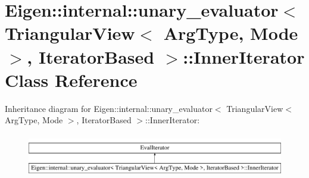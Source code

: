 \hypertarget{class_eigen_1_1internal_1_1unary__evaluator_3_01_triangular_view_3_01_arg_type_00_01_mode_01_4_0e8ca4efc3cb45e07bfa597fdc256f969}{}\section{Eigen\+::internal\+::unary\+\_\+evaluator$<$ Triangular\+View$<$ Arg\+Type, Mode $>$, Iterator\+Based $>$\+::Inner\+Iterator Class Reference}
\label{class_eigen_1_1internal_1_1unary__evaluator_3_01_triangular_view_3_01_arg_type_00_01_mode_01_4_0e8ca4efc3cb45e07bfa597fdc256f969}
Inheritance diagram for Eigen\+::internal\+::unary\+\_\+evaluator$<$ Triangular\+View$<$ Arg\+Type, Mode $>$, Iterator\+Based $>$\+::Inner\+Iterator\+:\begin{figure}[H]
\begin{center}
\leavevmode
\includegraphics[height=1.924399cm]{class_eigen_1_1internal_1_1unary__evaluator_3_01_triangular_view_3_01_arg_type_00_01_mode_01_4_0e8ca4efc3cb45e07bfa597fdc256f969}
\end{center}
\end{figure}
